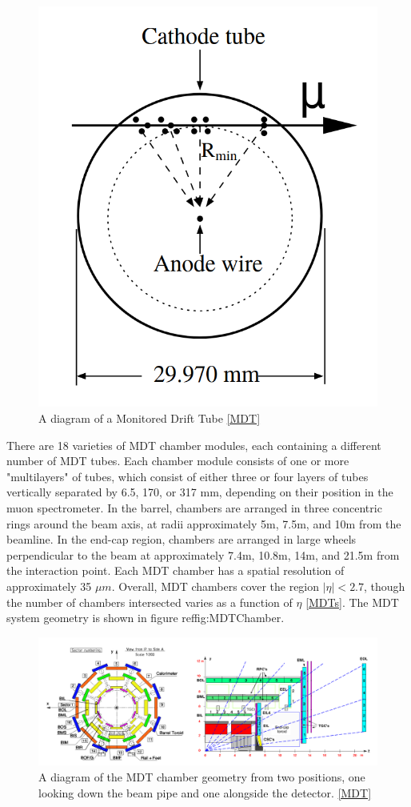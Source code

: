 \begin{figure}
  \includegraphics[width=0.5\linewidth]{figures/detector_chapter/MDT.png}
  \caption{A diagram of a Monitored Drift Tube \ref{MDT}}
  \label{fig:MDT}
\end{figure}

There are 18 varieties of MDT chamber modules, each containing a different number of MDT tubes. Each chamber module consists of one or more "multilayers" of tubes, which consist of either three or four layers of tubes vertically separated by 6.5, 170, or 317 mm, depending on their position in the muon spectrometer. In the barrel, chambers are arranged in three concentric rings around the beam axis, at radii approximately 5m, 7.5m, and 10m from the beamline. In the end-cap region, chambers are arranged in large wheels perpendicular to the beam at approximately 7.4m, 10.8m, 14m, and 21.5m from the interaction point. Each MDT chamber has a spatial resolution of approximately 35 $\mu m$. Overall, MDT chambers cover the region $ |\eta | < 2.7$, though the number of chambers intersected varies as a function of $\eta$ \ref{MDTs}. The MDT system geometry is shown in figure ref{fig:MDTChamber}. 

\begin{figure}[ht!]
  \includegraphics[width=\linewidth]{figures/detector_chapter/MDTChamber.png}
  \caption{A diagram of the MDT chamber geometry from two positions, one looking down the beam pipe and one alongside the detector. \ref{MDT}}
  \label{fig:MDTChamber}
\end{figure}

